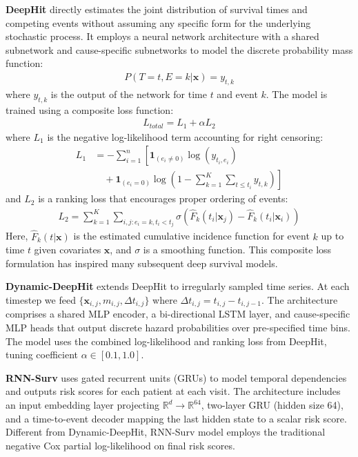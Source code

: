 \textbf{DeepHit} \citep{lee2018deephit} directly estimates the joint distribution of survival times and competing events without assuming any specific form for the underlying stochastic process. It employs a neural network architecture with a shared subnetwork and cause-specific subnetworks to model the discrete probability mass function:
\begin{align}
P(T=t, E=k|\boldsymbol{x}) = y_{t,k}
\end{align}
where $y_{t,k}$ is the output of the network for time $t$ and event $k$. The model is trained using a composite loss function:
\begin{align}
L_{total} = L_1 + \alpha L_2
\end{align}
where $L_1$ is the negative log-likelihood term accounting for right censoring:
\begin{align}
L_1 &= -\sum_{i=1}^n \left[ \mathbf{1}_{(e_i \neq 0)} \log(y_{t_i,e_i}) \right. \nonumber \\
&\quad + \left. \mathbf{1}_{(e_i = 0)} \log\left(1 - \sum_{k=1}^K \sum_{t \leq t_i} y_{t,k}\right) \right]
\end{align}
and $L_2$ is a ranking loss that encourages proper ordering of events:
\begin{align}
L_2 = \sum_{k=1}^K \sum_{i,j: e_i=k, t_i<t_j} \sigma\left(\hat{F}_k(t_i|\boldsymbol{x}_j) - \hat{F}_k(t_i|\boldsymbol{x}_i)\right)
\end{align}
Here, $\hat{F}_k(t|\boldsymbol{x})$ is the estimated cumulative incidence function for event $k$ up to time $t$ given covariates $\boldsymbol{x}$, and $\sigma$ is a smoothing function. This composite loss formulation has inspired many subsequent deep survival models.

\textbf{Dynamic-DeepHit} \citep{lee2020dynamicdeephit} extends DeepHit to irregularly sampled time series. At each timestep we feed $\{\mathbf{x}_{i,j}, m_{i,j}, \Delta t_{i,j}\}$ where $\Delta t_{i,j} = t_{i,j} - t_{i,j-1}$. The architecture comprises a shared MLP encoder, a bi-directional LSTM layer, and cause-specific MLP heads that output discrete hazard probabilities over pre-specified time bins. The model uses the combined log-likelihood and ranking loss from DeepHit, tuning coefficient $\alpha \in [0.1, 1.0]$.

\textbf{RNN-Surv} \citep{martinez2020rnnsurv} uses gated recurrent units (GRUs) to model temporal dependencies and outputs risk scores for each patient at each visit. The architecture includes an input embedding layer projecting $\mathbb{R}^d \to \mathbb{R}^{64}$, two-layer GRU (hidden size 64), and a time-to-event decoder mapping the last hidden state to a scalar risk score. Different from Dynamic-DeepHit, RNN-Surv model employs the traditional negative Cox partial log-likelihood on final risk scores. 

